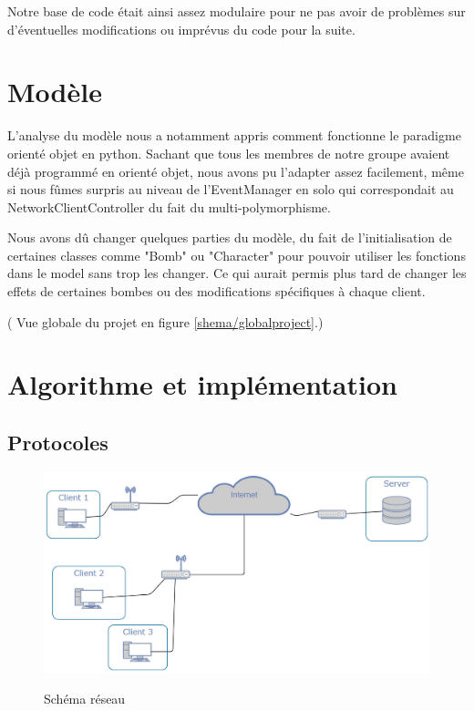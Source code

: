 \documentclass[a4paper]{article}
\begin{document}
	Notre base de code était ainsi assez modulaire pour ne pas avoir de problèmes sur d'éventuelles modifications ou imprévus du code pour la suite.

	\section{Modèle}

	L'analyse du modèle nous a notamment appris comment fonctionne le paradigme orienté objet en python. Sachant que tous les membres de notre groupe avaient déjà programmé en orienté objet, nous avons pu l'adapter assez facilement, même si nous fûmes surpris au niveau de l'EventManager en solo qui correspondait au NetworkClientController du fait du multi-polymorphisme.

	Nous avons dû changer quelques parties du modèle, du fait de l'initialisation de certaines classes comme "Bomb" ou "Character" pour pouvoir utiliser les fonctions dans le model sans trop les changer. Ce qui aurait permis plus tard de changer les effets de certaines bombes ou des modifications spécifiques à chaque client.

	( Vue globale du projet en figure \ref{shema/globalproject}.)


	\section{Algorithme et implémentation}
		\subsection{Protocoles}

\begin{figure}[!htbp]
	\centering
	\includegraphics[width=\textwidth]{IMG_Latex/Network.jpg}\\
	\caption{Schéma réseau}
	\label{shema/network}
\end{figure}
\end{document}

